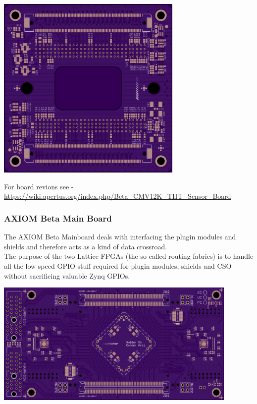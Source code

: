 \begin{center}
\includegraphics[height=9cm]{images/AXIOM_Beta_Sensor_THT_0.13_Bottom}
\end{center}

For board revions see - \href{https://wiki.apertus.org/index.php/Beta_CMV12K_THT_Sensor_Board}{https://wiki.apertus.org/index.php/Beta\_CMV12K\_THT\_Sensor\_Board}





\subsubsection{AXIOM Beta Main Board}

The AXIOM Beta Mainboard deals with interfacing the plugin modules and shields and therefore acts as a kind of data crossroad.\\

The purpose of the two Lattice FPGAs (the so called routing fabrics) is to handle all the low speed GPIO stuff required for plugin modules, shields and CSO without sacrificing valuable Zynq GPIOs.\\

\begin{center}
\includegraphics[height=6cm]{images/Beta_Main_Board_Top}
\end{center}

